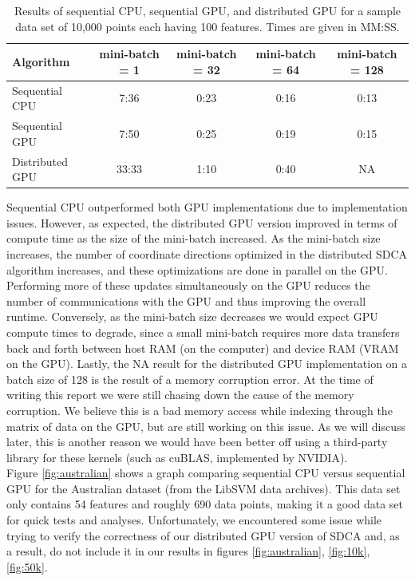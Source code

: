 \documentclass{article}
\begin{document}
\begin{table}
  \centering
  \caption{Results of sequential CPU, sequential GPU, and distributed GPU
    for a sample data set of 10,000 points each having 100 features. Times are
    given in MM:SS.}
  \label{tab:res-scale}
  \begin{tabular}{l|cccc}
      \textbf{Algorithm} & \textbf{mini-batch = 1} & \textbf{mini-batch = 32} &
      \textbf{mini-batch = 64} & \textbf{mini-batch = 128}\\\hline
      Sequential CPU & 7:36 & 0:23 & 0:16 & 0:13\\
      Sequential GPU & 7:50 & 0:25 & 0:19 & 0:15\\
      Distributed GPU & 33:33 & 1:10 & 0:40 & NA\\\hline
  \end{tabular}
\end{table}

Sequential CPU outperformed both GPU implementations due to implementation
issues. However, as expected, the distributed GPU version improved in terms of
compute time as the size of the mini-batch increased. As the mini-batch size
increases, the number of coordinate directions optimized in the distributed
SDCA algorithm increases, and these optimizations are done in parallel on the
GPU. Performing more of these updates simultaneously on the GPU reduces the
number of communications with the GPU and thus improving  the overall runtime.
Conversely, as the mini-batch size decreases we would expect GPU compute times
to degrade, since a small mini-batch requires more data transfers back and
forth between host RAM (on the computer) and device RAM (VRAM on the
GPU). Lastly, the NA result for the distributed GPU implementation on a batch
size of 128 is the result of a memory corruption error. At the time of writing
this report we were still chasing down the cause of the memory corruption. We
believe this is a bad memory access while indexing through the matrix of data on
the GPU, but are still working on this issue. As we will discuss later, this is
another reason we would have been better off using a third-party library for
these kernels (such as cuBLAS, implemented by NVIDIA).\\

Figure \ref{fig:australian} shows a graph comparing sequential CPU versus
sequential GPU for the Australian dataset (from the LibSVM data archives). This
data set only contains 54 features and roughly 690 data points, making it a good
data set for quick tests and analyses. Unfortunately, we encountered some issue
while trying to verify the correctness of our distributed GPU version of SDCA
and, as a result, do not include it in our results in figures
\ref{fig:australian}, \ref{fig:10k}, \ref{fig:50k}.
\end{document}

